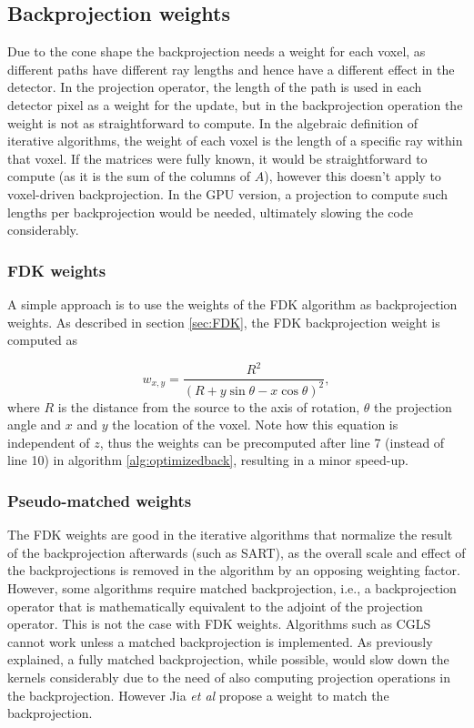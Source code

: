 \subsection{Backprojection weights}\label{sec:weights}

Due to the cone shape the backprojection needs a weight for each voxel, as different paths have different ray lengths and hence have a different effect in the detector. In the projection operator, the length of the path is used in each detector pixel as a weight for the update, but in the backprojection operation the weight is not as straightforward to compute. In the algebraic definition of iterative algorithms, the weight of each voxel is the length of a specific ray within that voxel. If the matrices were fully known, it would be straightforward to compute (as it is the sum of the columns of $A$), however this doesn't apply to voxel-driven backprojection. In the GPU version, a projection to compute such lengths per backprojection would be needed, ultimately slowing the code considerably.

\subsubsection*{FDK weights}
A simple approach is to use the weights of the FDK algorithm as backprojection weights. As described in section \ref{sec:FDK}, the FDK backprojection weight is computed as

\begin{equation}
w_{x,y}=\frac{R^2}{(R+y \sin\theta-x\cos\theta)^2},
\end{equation}
where $R$ is the distance from the source to the axis of rotation, $\theta$ the projection angle and $x$ and $y$ the location of the voxel. Note how this equation is independent of $z$, thus the weights can be precomputed after line 7 (instead of line 10) in algorithm \ref{alg:optimizedback}, resulting in a minor speed-up.


\subsubsection*{Pseudo-matched weights}
The FDK weights are good in the iterative algorithms that normalize the result of the backprojection afterwards (such as SART), as the overall scale and effect of the backprojections is removed in the algorithm by an opposing weighting factor. However, some algorithms require matched backprojection, i.e., a backprojection operator that is mathematically equivalent to the adjoint of the projection operator. This is not the case with FDK weights. Algorithms such as CGLS cannot work unless a matched backprojection is implemented. As previously explained, a fully matched backprojection, while possible, would slow down the kernels considerably due to the need of also computing projection operations in the backprojection. However Jia \textit{et al}\cite{jia2011gpu} propose a weight to match the backprojection.

